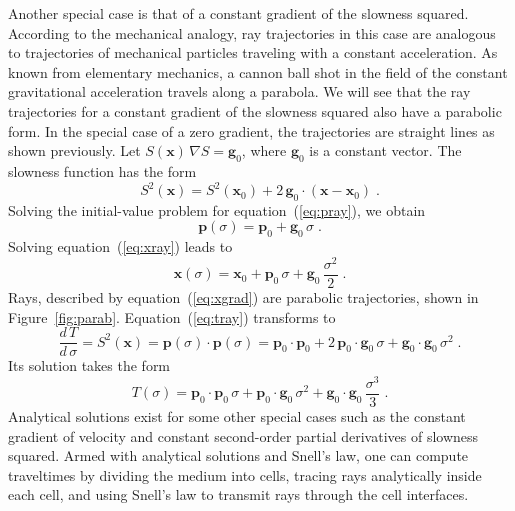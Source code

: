 Another special case is that of a constant gradient of the slowness squared.
According to the mechanical analogy, ray trajectories in this case are
analogous to trajectories of mechanical particles traveling with a constant
acceleration. As known from elementary mechanics, a cannon ball shot in the
field of the constant gravitational acceleration travels along a parabola. We
will see that the ray trajectories for a constant gradient of the slowness
squared also have a parabolic form. In the special case of a zero gradient,
the trajectories are straight lines as shown previously. Let
$S(\mathbf{x})\,\nabla S = \mathbf{g}_0$, where $\mathbf{g}_0$ is a constant
vector. The slowness function has the form
\begin{equation}
  \label{eq:grad}
  S^2(\mathbf{x}) = S^2(\mathbf{x}_0) + 
  2\,\mathbf{g}_0 \cdot (\mathbf{x}-\mathbf{x}_0)\;.
\end{equation}
Solving the initial-value problem for equation~(\ref{eq:pray}), we obtain
\begin{equation}
  \label{eq:pgrad}
  \mathbf{p}(\sigma) =  \mathbf{p}_0 + \mathbf{g}_0\,\sigma\;.
\end{equation}
Solving equation~(\ref{eq:xray}) leads to
\begin{equation}
  \label{eq:xgrad}
  \mathbf{x}(\sigma) = \mathbf{x}_0 + \mathbf{p}_0\,\sigma
  + \mathbf{g}_0\,\frac{\sigma^2}{2}\;.
\end{equation}
Rays, described by equation~(\ref{eq:xgrad}) are parabolic trajectories, shown
in Figure~\ref{fig:parab}.  Equation~(\ref{eq:tray}) transforms to
\begin{equation}
  \label{eq:tgrad0}
  \frac{d\,T}{d\,\sigma} = S^2(\mathbf{x}) = 
  \mathbf{p}(\sigma) \cdot \mathbf{p}(\sigma) =
  \mathbf{p}_0 \cdot \mathbf{p}_0 + 2\,\mathbf{p}_0 \cdot \mathbf{g}_0\,\sigma
  +  \mathbf{g}_0 \cdot \mathbf{g}_0\,\sigma^2\;.
\end{equation}
Its solution takes the form
\begin{equation}
  \label{eq:tgrad}
  T(\sigma) = \mathbf{p}_0 \cdot \mathbf{p}_0\,\sigma +
  \mathbf{p}_0 \cdot \mathbf{g}_0\,\sigma^2 +  
  \mathbf{g}_0 \cdot \mathbf{g}_0\,\frac{\sigma^3}{3}\;.
\end{equation}
Analytical solutions exist for some other special cases such as the
constant gradient of velocity and constant second-order partial
derivatives of slowness squared. Armed with analytical solutions and
Snell's law, one can compute traveltimes by dividing the medium into
cells, tracing rays analytically inside each cell, and using Snell's
law to transmit rays through the cell interfaces.

